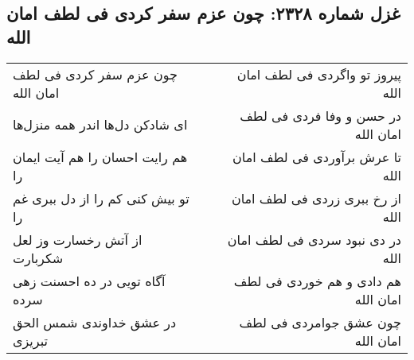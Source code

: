 \begin{center}
\section*{غزل شماره ۲۳۲۸: چون عزم سفر کردی فی لطف امان الله}
\label{sec:2328}
\begin{longtable}{l p{0.5cm} r}
چون عزم سفر کردی فی لطف امان الله
&&
پیروز تو واگردی فی لطف امان الله
\\
ای شادکن دل‌ها اندر همه منزل‌ها
&&
در حسن و وفا فردی فی لطف امان الله
\\
هم رایت احسان را هم آیت ایمان را
&&
تا عرش برآوردی فی لطف امان الله
\\
تو بیش کنی کم را از دل ببری غم را
&&
از رخ ببری زردی فی لطف امان الله
\\
از آتش رخسارت وز لعل شکربارت
&&
در دی نبود سردی فی لطف امان الله
\\
آگاه تویی در ده احسنت زهی سرده
&&
هم دادی و هم خوردی فی لطف امان الله
\\
در عشق خداوندی شمس الحق تبریزی
&&
چون عشق جوامردی فی لطف امان الله
\\
\end{longtable}
\end{center}
